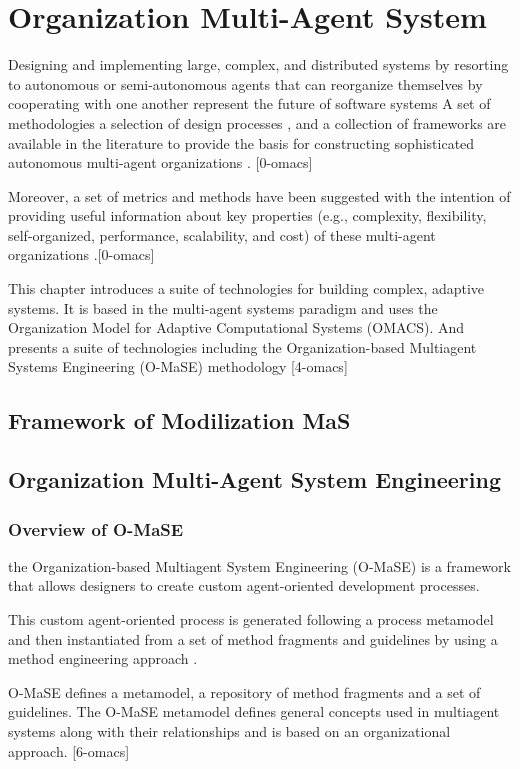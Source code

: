 
\chapter{\label{cha:org}Organization Multi-Agent System}

Designing and implementing large, complex, and distributed systems by resorting to autonomous 
or semi-autonomous agents that can reorganize themselves by  cooperating with one another 
represent the future of software systems   A set of  methodologies  a selection of design processes ,
and a collection of  frameworks are available in the literature to provide the basis for constructing 
sophisticated autonomous multi-agent organizations . [0-omacs]
 
 
Moreover, a set of metrics and methods have been suggested with the intention of providing useful information 
about key properties (e.g., complexity, flexibility, self-organized, performance, scalability, and cost)
of these multi-agent organizations  .[0-omacs]

This chapter introduces a suite of technologies for building complex, adaptive systems. 
It is based in the multi-agent systems paradigm and uses the Organization Model for Adaptive 
Computational Systems  (OMACS). 
And presents a suite of technologies including  the Organization-based Multiagent Systems Engineering 
(O-MaSE) methodology [4-omacs]

\section*{ \Huge{Framework of Modilization MaS} }
\section{ Organization Multi-Agent System Engineering}
\subsection{ Overview of O-MaSE }
 the Organization-based Multiagent System Engineering (O-MaSE) is a framework that 
 allows designers to create custom agent-oriented development processes. 
 
This custom agent-oriented process is generated following a process metamodel 
and then instantiated from a set of method fragments and guidelines 
by using a method engineering approach . 

O-MaSE defines a metamodel, a repository of method fragments and a set of guidelines. 
The O-MaSE metamodel defines general concepts used in multiagent systems
along with their relationships and is based on an organizational approach. [6-omacs]
 
